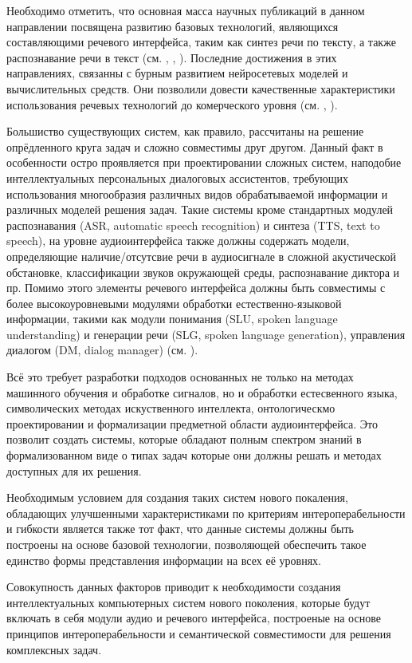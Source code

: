 Необходимо отметить, что основная масса научных публикаций в данном направлении посвящена развитию базовых технологий, являющихся составляющими речевого интерфейса, таким как синтез речи по тексту, а также распознавание речи в текст (см. , , ). Последние достижения в этих направлениях, связанны с бурным развитием нейросетевых моделей и вычислительных средств. Они позволили довести качественные характеристики использования речевых технологий до комерческого уровня (см. , ).

Большиство существующих систем, как правило, рассчитаны на решение опрёдленного круга задач и сложно совместимы друг другом. Данный факт в особенности остро проявляется при проектировании сложных систем, наподобие интеллектуальных персональных диалоговых ассистентов, требующих использования многообразия различных видов обрабатываемой информации и различных моделей решения задач. Такие системы кроме стандартных модулей распознавания (ASR, automatic speech recognition) и синтеза (TTS, text to speech), на уровне аудиоинтерфейса также должны содержать модели, определяющие наличие/отсутсвие речи в аудиосигнале в сложной акустической обстановке, классификации звуков окружающей среды, распознавание диктора и пр. Помимо этого элементы речевого интерфейса должны быть совместимы с более высокоуровневыми модулями обработки естественно-языковой информации, такими как модули понимания (SLU, spoken language understanding) и генерации речи (SLG, spoken language generation), управления диалогом (DM, dialog manager) (см. ). 

Всё это требует разработки подходов основанных не только на методах машинного обучения и обработке сигналов, но и обработки естесвенного языка, символических методах искуственного интеллекта, онтологическмо проектировании и формализации предметной области аудиоинтерфейса. Это позволит создать системы, которые обладают полным спектром знаний в формализованном виде о типах задач которые они должны решать и методах доступных для их решения.

Необходимым условием для создания таких систем нового покаления, обладающих улучшенными характеристиками по критериям интероперабельности и гибкости является также тот факт, что данные системы должны быть построены на основе базовой технологии, позволяющей обеспечить такое единство формы представления информации на всех её уровнях.
 
Совокупность данных факторов приводит к необходимости создания интеллектуальных компьютерных систем нового поколения, которые будут включать в себя модули аудио и речевого интерфейса, построеные на основе принципов интероперабельности и семантической совместимости для решения комплексных задач.


